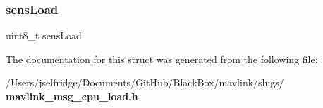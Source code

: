 \subsubsection{sens\+Load}
{\footnotesize\ttfamily uint8\+\_\+t sens\+Load}



The documentation for this struct was generated from the following file\+:\begin{DoxyCompactItemize}
\item 
/\+Users/jselfridge/\+Documents/\+Git\+Hub/\+Black\+Box/mavlink/slugs/\textbf{ mavlink\+\_\+msg\+\_\+cpu\+\_\+load.\+h}\end{DoxyCompactItemize}

